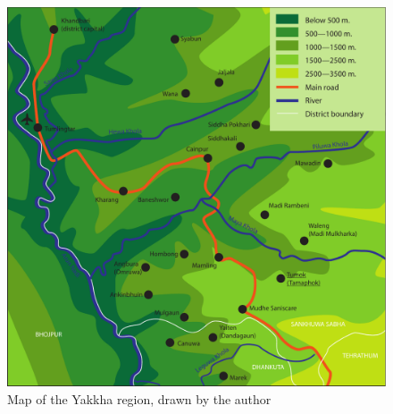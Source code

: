 \begin{figure}[p]
\centering
\includegraphics[width=\textwidth]{figures/Yakkha_mapDS.pdf}
\caption{Map of the Yakkha region, drawn by the author}\label{map-sank}
\end{figure}



